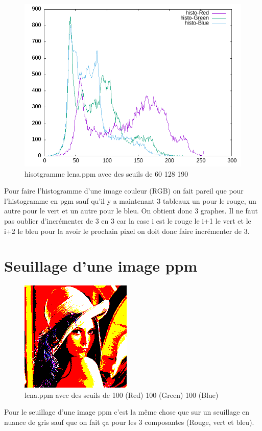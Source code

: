 \documentclass{article}
\begin{document}
\begin{figure}[h]
\centerline{\includegraphics[scale=0.6]{./rendus/histoppmlena.png}}
\caption{hisotgramme lena.ppm avec des seuils de 60 128 190}
\end{figure}

Pour faire l'histogramme d'une image couleur (RGB) on fait pareil que pour l'histogramme en pgm sauf qu'il y a maintenant 3 tableaux un pour le rouge, un autre pour le vert et un autre pour le bleu. On obtient donc 3 graphes. Il ne faut pas oublier d'incrémenter de 3 en 3 car la case i est le rouge le i+1 le vert et le i+2 le bleu pour la avoir le prochain pixel on doit donc faire incrémenter de 3.

\section{Seuillage d'une image ppm}

\begin{figure}[h]
\centerline{\includegraphics[scale=0.8]{./rendus/lenaSeuilppm.png}}
\caption{lena.ppm avec des seuils de 100 (Red) 100 (Green) 100 (Blue)}
\end{figure}

Pour le seuillage d'une image ppm c'est la même chose que sur un seuillage en nuance de gris sauf que on fait ça pour les 3 composantes (Rouge, vert et bleu).
\end{document}
